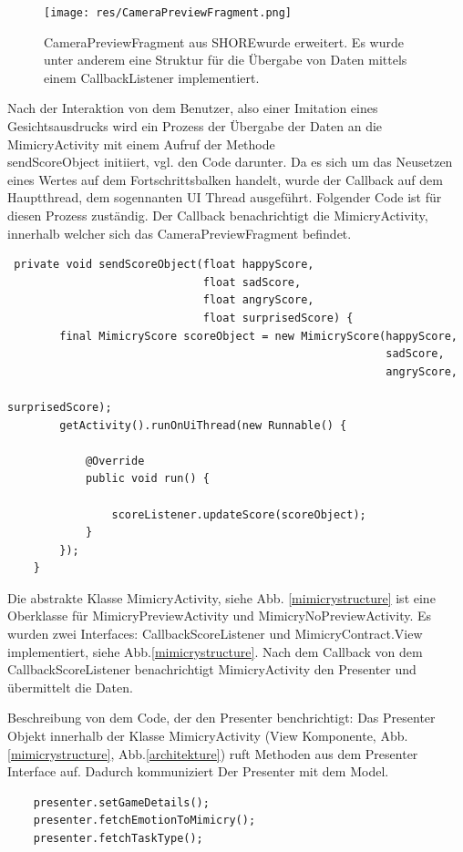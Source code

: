\begin{figure}[!ht]
    \centering\texttt{[image: res/CameraPreviewFragment.png]}
\caption{CameraPreviewFragment aus SHORE\re wurde erweitert. Es wurde unter anderem eine Struktur für die Übergabe von Daten mittels einem CallbackListener implementiert.}
\label{view}
\end{figure}
\newpage
Nach der Interaktion von dem Benutzer, also einer Imitation eines Gesichtsausdrucks wird ein Prozess der Übergabe der Daten an die MimicryActivity mit einem Aufruf der Methode \\sendScoreObject initiiert, vgl. den Code darunter. Da es sich um das Neusetzen eines Wertes auf dem Fortschrittsbalken handelt, wurde der Callback auf dem Hauptthread, dem sogennanten UI Thread ausgeführt. Folgender Code ist für diesen Prozess zuständig. Der Callback benachrichtigt die MimicryActivity, innerhalb welcher sich das CameraPreviewFragment befindet.
\begin{verbatim}
 private void sendScoreObject(float happyScore,
                              float sadScore,
                              float angryScore,
                              float surprisedScore) {
        final MimicryScore scoreObject = new MimicryScore(happyScore,
                                                          sadScore, 
                                                          angryScore,
                                                          surprisedScore);
        getActivity().runOnUiThread(new Runnable() {

            @Override
            public void run() {

                scoreListener.updateScore(scoreObject);
            }
        });
    }
\end{verbatim}
\newpage
Die abstrakte Klasse MimicryActivity, siehe Abb. \ref{mimicrystructure} ist eine Oberklasse für MimicryPreviewActivity und MimicryNoPreviewActivity. Es wurden zwei Interfaces: CallbackScoreListener und MimicryContract.View implementiert, siehe Abb.\ref{mimicrystructure}.
Nach dem Callback von dem CallbackScoreListener benachrichtigt MimicryActivity den Presenter und übermittelt die Daten.

Beschreibung von dem Code, der den Presenter benchrichtigt:
Das Presenter Objekt innerhalb der Klasse MimicryActivity (View Komponente, Abb.\ref{mimicrystructure}, Abb.\ref{architekture}) ruft Methoden aus dem Presenter Interface auf. Dadurch kommuniziert Der Presenter mit dem Model.
\begin{verbatim}
    presenter.setGameDetails();
    presenter.fetchEmotionToMimicry();
    presenter.fetchTaskType();
\end{verbatim}

